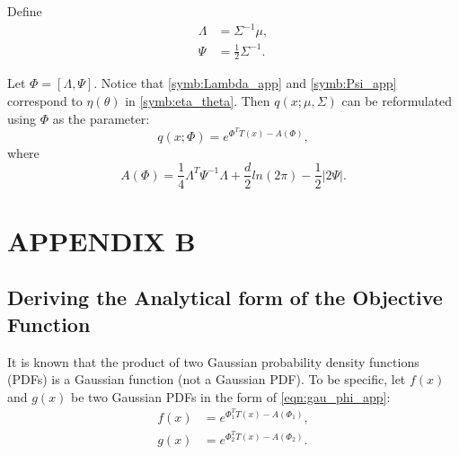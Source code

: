 \documentclass[twocolumn,10pt]{asme2e}
\begin{document}
Define 
\begin{subequations}
	\begin{align}
	\Lambda&=\Sigma^{-1}\mu, \label{symb:Lambda_app}\\
	\Psi&=\frac{1}{2}\Sigma^{-1}. \label{symb:Psi_app}
	\end{align}
\end{subequations}

Let $\Phi = \left[\Lambda,\Psi\right]$.
Notice that \cref{symb:Lambda_app} and \cref{symb:Psi_app} correspond to $\eta(\theta)$ in \cref{symb:eta_theta}.
Then $q(x;\mu,\Sigma)$ can be reformulated using $\Phi$ as the parameter:
\begin{equation*}%
q(x;\Phi)=e^{\Phi^TT(x)-A(\Phi)},
\end{equation*}
where
\begin{equation*}
A(\Phi)=\frac{1}{4}\Lambda^T\Psi^{-1}\Lambda+\frac{d}{2}ln(2\pi)-\frac{1}{2}|2\Psi|\label{symb:A_Phi_app}.
\end{equation*}

\section*{APPENDIX B}\label{append_b}
\subsection*{Deriving the Analytical form of the Objective Function}
It is known that the product of two Gaussian probability density functions (PDFs) is a Gaussian function (not a Gaussian PDF).
To be specific, let $f(x)$ and $g(x)$ be two Gaussian PDFs in the form of \cref{eqn:gau_phi_app}:
\begin{subequations}
	\begin{align*}
	f(x)&=e^{\Phi_1^TT(x)-A(\Phi_1)},\\
	g(x)&=e^{\Phi_2^TT(x)-A(\Phi_2)}.
	\end{align*}
\end{subequations}
\end{document}
